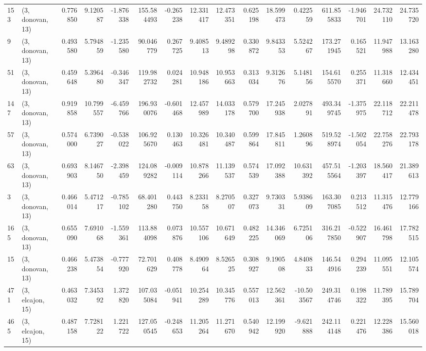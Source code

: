 \begin{tabular}{llrrrrrrrrrrrrrr}
153 &  (3, donovan, 13) &   0.776850 &   9.120587 &  -1.876338 &   155.584493 &  -0.265238 &  12.331417 &  12.473351 &  0.625198 &  18.599473 &   0.422559 &   611.855833 & -1.946701 &  24.732110 &  24.735720 \\
9   &  (3, donovan, 13) &   0.493580 &   5.794859 &  -1.235580 &    90.046779 &   0.267725 &   9.408513 &   9.489298 &  0.330872 &   9.843353 &   5.524267 &   173.271945 &  0.165521 &  11.947988 &  13.163280 \\
51  &  (3, donovan, 13) &   0.459648 &   5.396480 &  -0.346347 &   119.982732 &   0.024281 &  10.948186 &  10.953663 &  0.313034 &   9.312676 &   5.148156 &   154.615570 &  0.255371 &  11.318660 &  12.434451 \\
147 &  (3, donovan, 13) &   0.919858 &  10.799557 &  -6.459766 &   196.930076 &  -0.601468 &  12.457989 &  14.033178 &  0.579700 &  17.245938 &   2.027891 &   493.349745 & -1.375975 &  22.118712 &  22.211478 \\
57  &  (3, donovan, 13) &   0.574000 &   6.739027 &  -0.538022 &   106.925670 &   0.130463 &  10.326481 &  10.340487 &  0.599864 &  17.845811 &   1.260896 &   519.528974 & -1.502054 &  22.758276 &  22.793178 \\
63  &  (3, donovan, 13) &   0.693903 &   8.146750 &  -2.398459 &   124.089282 &  -0.009114 &  10.878266 &  11.139537 &  0.574539 &  17.092388 &  10.631392 &   457.515564 & -1.203397 &  18.560417 &  21.389613 \\
3   &  (3, donovan, 13) &   0.466014 &   5.471217 &  -0.785102 &    68.401280 &   0.443750 &   8.233158 &   8.270507 &  0.327073 &   9.730331 &   5.938609 &   163.307085 &  0.213512 &  11.315476 &  12.779166 \\
165 &  (3, donovan, 13) &   0.655090 &   7.691068 &  -1.559361 &   113.884098 &   0.073876 &  10.557106 &  10.671649 &  0.482225 &  14.346069 &   6.725106 &   316.217850 & -0.522907 &  16.461798 &  17.782515 \\
15  &  (3, donovan, 13) &   0.466238 &   5.473854 &  -0.777920 &    72.701629 &   0.408778 &   8.490964 &   8.526525 &  0.308927 &   9.190508 &   4.840833 &   146.544916 &  0.294239 &  11.095551 &  12.105574 \\
471 &  (3, elcajon, 15) &   0.463032 &   7.345392 &   1.372820 &   107.035084 &  -0.051941 &  10.254289 &  10.345776 &  0.557013 &  12.562361 & -10.503567 &   249.314746 &  0.198322 &  11.789395 &  15.789704 \\
465 &  (3, elcajon, 15) &   0.487158 &   7.728122 &   1.221722 &   127.050545 &  -0.248653 &  11.205264 &  11.271670 &  0.540942 &  12.199920 &  -9.621888 &   242.114148 &  0.221476 &  12.228386 &  15.560018 \\

\end{tabular}
